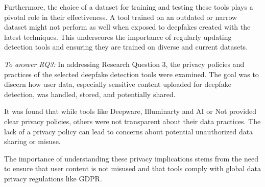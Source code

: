 Furthermore, the choice of a dataset for training and testing these tools plays a pivotal role
in their effectiveness. A tool trained on an outdated or narrow dataset might not perform as
well when exposed to deepfakes created with the latest techniques. This underscores the
importance of regularly updating detection tools and ensuring they are trained on diverse
and current datasets.

\textit{To answer \ac{RQ}3:} In addressing Research Question 3, the privacy policies
and practices of the selected deepfake detection tools were examined. The goal was to
discern how user data, especially sensitive content uploaded for deepfake detection,
was handled, stored, and potentially shared.

It was found that while tools like Deepware, Illuminarty and AI or Not provided clear privacy
policies, others were not transparent about their data practices. The lack of a privacy
policy can lead to concerns about potential unauthorized data sharing or misuse.

The importance of understanding these privacy implications stems from the need to
ensure that user content is not misused and that tools comply with global data privacy
regulations like \ac{GDPR}.


